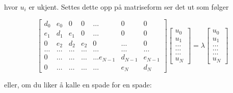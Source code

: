 \documentclass{article}
\begin{document}
hvor $u_i$ er ukjent. Settes dette opp på matriseform ser det ut som følger

\begin{equation}
    \begin{bmatrix}d_0 & e_0 & 0   & 0    & \dots  &0     & 0 \\
                                e_1 & d_1 & e_1 & 0    & \dots  &0     &0 \\
                                0   & e_2 & d_2 & e_2  &0       &\dots & 0\\
                                \dots  & \dots & \dots & \dots  &\dots      &\dots & \dots\\
                                0   & \dots & \dots & \dots  &\dots  e_{N-1}     &d_{N-1} & e_{N-1}\\
                                0   & \dots & \dots & \dots  &\dots       &e_{N} & d_{N}
             \end{bmatrix}  \begin{bmatrix} u_{0} \\
                                                              u_{1} \\
                                                              \dots\\ \dots\\ \dots\\
                                                              u_{N}
             \end{bmatrix}=\lambda \begin{bmatrix} u_{0} \\
                                                              u_{1} \\
                                                              \dots\\ \dots\\ \dots\\
                                                              u_{N}
             \end{bmatrix}
\end{equation} 

eller, om du liker å kalle en spade for en spade:
\end{document}
